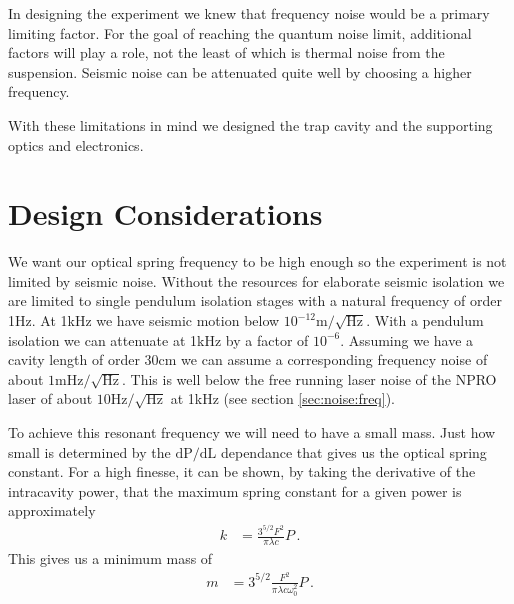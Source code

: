 \acresetall

In designing the experiment we knew that frequency noise would be a
primary limiting factor.
For the goal of reaching the quantum noise limit, additional factors will
play a role, not the least of which is thermal noise from the suspension.
Seismic noise can be attenuated quite well by choosing a higher frequency.

With these limitations in mind we designed the trap cavity and the supporting
optics and electronics.

%
%


\section{Design Considerations}
\label{sec:lintrap:design}

We want our optical spring frequency to be high enough so the experiment is
not limited by seismic noise.
Without the resources for elaborate seismic isolation we are limited to single
pendulum isolation stages with a natural frequency of order 1Hz.
At 1kHz we have seismic motion below $10^{-12} \mathrm{m/\sqrt{Hz}}$.
With a pendulum isolation we can attenuate at 1kHz by a factor of $10^{-6}$.
Assuming we have a cavity length of order 30cm we can assume a corresponding
frequency noise of about $1 \mathrm{mHz/\sqrt{Hz}}$.
This is well below the free running laser noise of the NPRO laser of about
$10\mathrm{Hz/\sqrt{Hz}}$ at 1kHz (see section \ref{sec:noise:freq}).


To achieve this resonant frequency we will need to have a small mass.
Just how small is determined by the $\mathrm{dP/dL}$ dependance that gives
us the optical spring constant.
For a high finesse, it can be shown, by taking the derivative of the
intracavity power,
that the maximum spring constant for a given power is approximately
\begin{align}
k &= \frac{3^{5/2} F^2}{\pi \lambda c} P \,.
\end{align}
This gives us a minimum mass of
\begin{align}
m &= 3^{5/2} \frac{F^2}{\pi \lambda c \omega^2_0} P \, .
\end{align}



